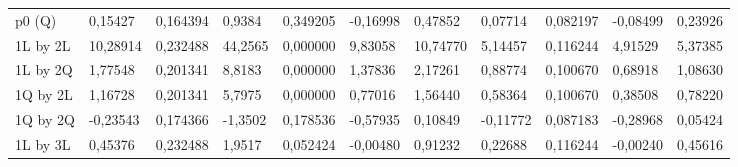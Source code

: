 \begin{table}[]
{\begin{tabular}{lllllllllll}
\rowcolor[HTML]{FFFFFF} 
{\color[HTML]{000000} p0      (Q)}    & {\color[HTML]{181A1B} 0,15427}  & {\color[HTML]{181A1B} 0,164394} & {\color[HTML]{181A1B} 0,9384}   & {\color[HTML]{181A1B} 0,349205} & {\color[HTML]{181A1B} -0,16998}       & {\color[HTML]{181A1B} 0,47852}        & {\color[HTML]{181A1B} 0,07714}  & {\color[HTML]{181A1B} 0,082197}      & {\color[HTML]{181A1B} -0,08499}       & {\color[HTML]{181A1B} 0,23926}        \\
\rowcolor[HTML]{FFFFFF} 
{\color[HTML]{000000} 1L by 2L}       & {\color[HTML]{FF0000} 10,28914} & {\color[HTML]{FF0000} 0,232488} & {\color[HTML]{FF0000} 44,2565}  & {\color[HTML]{FF0000} 0,000000} & {\color[HTML]{FF0000} 9,83058}        & {\color[HTML]{FF0000} 10,74770}       & {\color[HTML]{FF0000} 5,14457}  & {\color[HTML]{FF0000} 0,116244}      & {\color[HTML]{FF0000} 4,91529}        & {\color[HTML]{FF0000} 5,37385}        \\
\rowcolor[HTML]{FFFFFF} 
{\color[HTML]{000000} 1L by 2Q}       & {\color[HTML]{FF0000} 1,77548}  & {\color[HTML]{FF0000} 0,201341} & {\color[HTML]{FF0000} 8,8183}   & {\color[HTML]{FF0000} 0,000000} & {\color[HTML]{FF0000} 1,37836}        & {\color[HTML]{FF0000} 2,17261}        & {\color[HTML]{FF0000} 0,88774}  & {\color[HTML]{FF0000} 0,100670}      & {\color[HTML]{FF0000} 0,68918}        & {\color[HTML]{FF0000} 1,08630}        \\
\rowcolor[HTML]{FFFFFF} 
{\color[HTML]{000000} 1Q by 2L}       & {\color[HTML]{FF0000} 1,16728}  & {\color[HTML]{FF0000} 0,201341} & {\color[HTML]{FF0000} 5,7975}   & {\color[HTML]{FF0000} 0,000000} & {\color[HTML]{FF0000} 0,77016}        & {\color[HTML]{FF0000} 1,56440}        & {\color[HTML]{FF0000} 0,58364}  & {\color[HTML]{FF0000} 0,100670}      & {\color[HTML]{FF0000} 0,38508}        & {\color[HTML]{FF0000} 0,78220}        \\
\rowcolor[HTML]{FFFFFF} 
{\color[HTML]{000000} 1Q by 2Q}       & {\color[HTML]{181A1B} -0,23543} & {\color[HTML]{181A1B} 0,174366} & {\color[HTML]{181A1B} -1,3502}  & {\color[HTML]{181A1B} 0,178536} & {\color[HTML]{181A1B} -0,57935}       & {\color[HTML]{181A1B} 0,10849}        & {\color[HTML]{181A1B} -0,11772} & {\color[HTML]{181A1B} 0,087183}      & {\color[HTML]{181A1B} -0,28968}       & {\color[HTML]{181A1B} 0,05424}        \\
\rowcolor[HTML]{FFFFFF} 
{\color[HTML]{000000} 1L by 3L}       & {\color[HTML]{181A1B} 0,45376}  & {\color[HTML]{181A1B} 0,232488} & {\color[HTML]{181A1B} 1,9517}   & {\color[HTML]{181A1B} 0,052424} & {\color[HTML]{181A1B} -0,00480}       & {\color[HTML]{181A1B} 0,91232}        & {\color[HTML]{181A1B} 0,22688}  & {\color[HTML]{181A1B} 0,116244}      & {\color[HTML]{181A1B} -0,00240}       & {\color[HTML]{181A1B} 0,45616}        \\

\end{tabular}}
\end{table}
